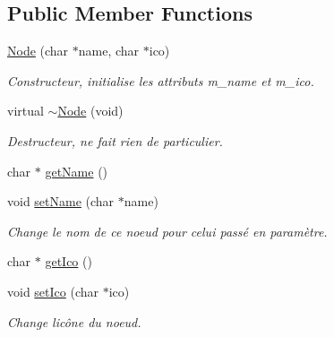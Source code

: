 \subsection*{Public Member Functions}
\begin{DoxyCompactItemize}
\item 
\hyperlink{class_e_p_1_1_node_a9df197a78c36646fba1670935f5ea948}{Node} (char $\ast$name, char $\ast$ico)\hypertarget{class_e_p_1_1_node_a9df197a78c36646fba1670935f5ea948}{}\label{class_e_p_1_1_node_a9df197a78c36646fba1670935f5ea948}

\begin{DoxyCompactList}\small\item\em Constructeur, initialise les attributs m\+\_\+name et m\+\_\+ico. \end{DoxyCompactList}\item 
virtual \hyperlink{class_e_p_1_1_node_a247e246a75f5b7111d53a1e4de19fb0b}{$\sim$\+Node} (void)\hypertarget{class_e_p_1_1_node_a247e246a75f5b7111d53a1e4de19fb0b}{}\label{class_e_p_1_1_node_a247e246a75f5b7111d53a1e4de19fb0b}

\begin{DoxyCompactList}\small\item\em Destructeur, ne fait rien de particulier. \end{DoxyCompactList}\item 
char $\ast$ \hyperlink{class_e_p_1_1_node_ad5dd5dfbe1e26a22de54035a16ddb980}{get\+Name} ()
\item 
void \hyperlink{class_e_p_1_1_node_a27a879726020308b8fd47812ec4a8b86}{set\+Name} (char $\ast$name)
\begin{DoxyCompactList}\small\item\em Change le nom de ce noeud pour celui passé en paramètre. \end{DoxyCompactList}\item 
char $\ast$ \hyperlink{class_e_p_1_1_node_a7e29d725cfe687589f5668c9825fc303}{get\+Ico} ()
\item 
void \hyperlink{class_e_p_1_1_node_a0f1a35a7f9e6d18d38a17b591a130862}{set\+Ico} (char $\ast$ico)
\begin{DoxyCompactList}\small\item\em Change l\textquotesingle{}icône du noeud. \end{DoxyCompactList}\end{DoxyCompactItemize}
